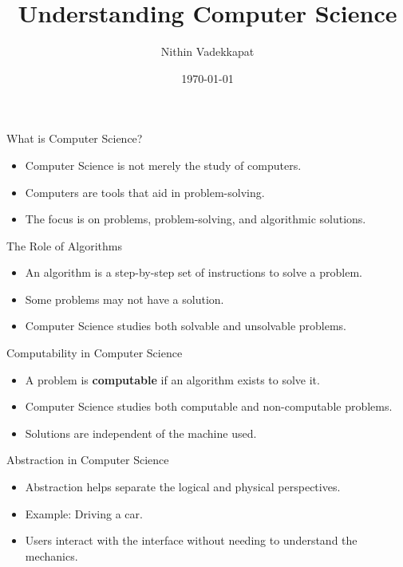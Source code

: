 \documentclass{beamer}
\title{Understanding Computer Science}
\author{Nithin Vadekkapat}
\date{\today}
\begin{document}
\frame{\titlepage}

\begin{frame}{What is Computer Science?}
    \begin{itemize}
        \item Computer Science is not merely the study of computers.
        \item Computers are tools that aid in problem-solving.
        \item The focus is on problems, problem-solving, and algorithmic solutions.
    \end{itemize}
\end{frame}

\begin{frame}{The Role of Algorithms}
    \begin{itemize}
        \item An algorithm is a step-by-step set of instructions to solve a problem.
        \item Some problems may not have a solution.
        \item Computer Science studies both solvable and unsolvable problems.
    \end{itemize}
\end{frame}

\begin{frame}{Computability in Computer Science}
    \begin{itemize}
        \item A problem is \textbf{computable} if an algorithm exists to solve it.
        \item Computer Science studies both computable and non-computable problems.
        \item Solutions are independent of the machine used.
    \end{itemize}
\end{frame}

\begin{frame}{Abstraction in Computer Science}
    \begin{itemize}
        \item Abstraction helps separate the logical and physical perspectives.
        \item Example: Driving a car.
        \item Users interact with the interface without needing to understand the mechanics.
    \end{itemize}
\end{frame}
\end{document}
